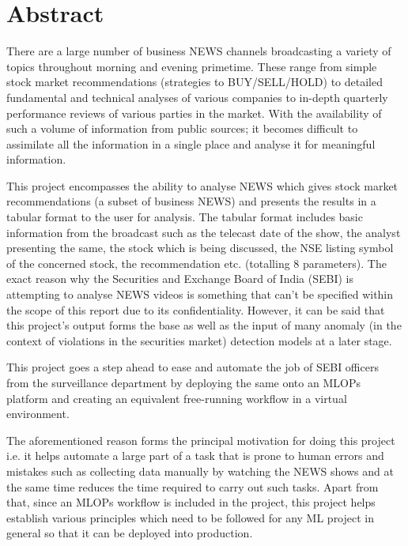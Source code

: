 \chapter*{Abstract}

There are a large number of business NEWS channels broadcasting a variety of topics throughout morning and evening primetime. These range from simple stock market recommendations (strategies to BUY/SELL/HOLD) to detailed fundamental and technical analyses of various companies to in-depth quarterly performance reviews of various parties in the market. With the availability of such a volume of information from public sources; it becomes difficult to assimilate all the information in a single place and analyse it for meaningful information. \par

This project encompasses the ability to analyse NEWS which gives stock market recommendations (a subset of business NEWS) and presents the results in a tabular format to the user for analysis. The tabular format includes basic information from the broadcast such as the telecast date of the show, the analyst presenting the same, the stock which is being discussed, the NSE listing symbol of the concerned stock, the recommendation etc. (totalling 8 parameters). The exact reason why the Securities and Exchange Board of India (SEBI) is attempting to analyse NEWS videos is something that can’t be specified within the scope of this report due to its confidentiality. However, it can be said that this project’s output forms the base as well as the input of many anomaly (in the context of violations in the securities market) detection models at a later stage. \par

This project goes a step ahead to ease and automate the job of SEBI officers from the surveillance department by deploying the same onto an MLOPs platform and creating an equivalent free-running workflow in a virtual environment. \par

The aforementioned reason forms the principal motivation for doing this project i.e. it helps automate a large part of a task that is prone to human errors and mistakes such as collecting data manually by watching the NEWS shows and at the same time reduces the time required to carry out such tasks. Apart from that, since an MLOPs workflow is included in the project, this project helps establish various principles which need to be followed for any ML project in general so that it can be deployed into production.
